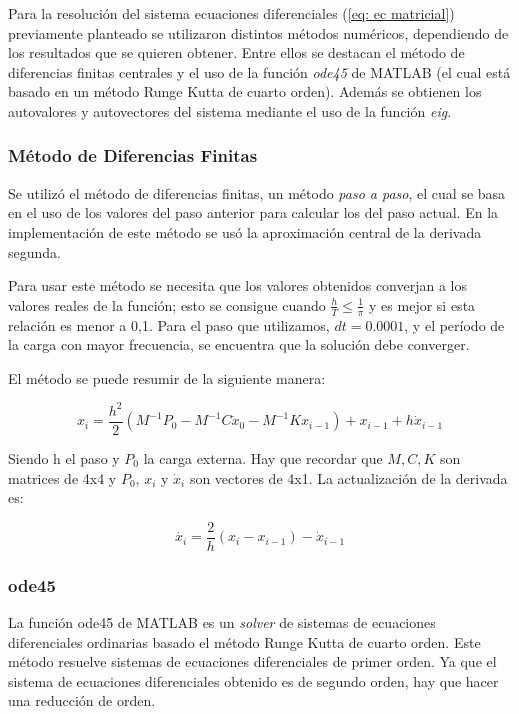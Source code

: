 \documentclass[oneside, a4paper, spanish, links]{amca}
\begin{document}
Para la resolución del sistema ecuaciones diferenciales (\ref{eq: ec matricial}) previamente planteado se utilizaron distintos métodos numéricos, dependiendo de los resultados que se quieren obtener. Entre ellos se destacan el método de diferencias finitas centrales y el uso de la función \textit{ode45} de MATLAB (el cual está basado en un método Runge Kutta de cuarto orden). Además se obtienen los autovalores y autovectores del sistema mediante el uso de la función \textit{eig}. 

\subsubsection{Método de Diferencias Finitas}
\label{sec:dif finitas}

Se utilizó el método de diferencias finitas, un método \textit{paso a paso}, el cual se basa en el uso de los valores del paso anterior para calcular los del paso actual.
En la implementación de este método se usó la aproximación central de la derivada segunda.

Para usar este método se necesita que los valores obtenidos converjan a los valores reales de la función; esto se consigue cuando $\frac{h}{T} \leq \frac{1}{\pi}$ y es mejor si esta relación es menor a 0,1. Para el paso que utilizamos, $dt = 0.0001$, y el período de la carga con mayor frecuencia, se encuentra que la solución debe converger.

El método se puede resumir de la siguiente manera: 

\begin{equation}
    x_i=\frac{h^2}{2}(M^{-1}P_0 - M^{-1}C\dot{x}_0 - M^{-1}Kx_{i-1}) + x_{i-1} + h\dot{x}_{i-1}
\end{equation}

Siendo h el paso y $P_0$ la carga externa. Hay que recordar que $M, C, K$ son matrices de 4x4 y $P_0$, $x_i$ y $\dot{x}_i$ son vectores de 4x1. La actualización de la derivada es: 

\begin{equation}
    \dot{x_i}=\frac{2}{h}(x_i-x_{i-1})-{\dot{x}_{i-1}}
\end{equation}

\subsubsection{ode45}
\label{sec:ode45}

La función ode45 de MATLAB es un \textit{solver} de sistemas de ecuaciones diferenciales ordinarias basado el método Runge Kutta de cuarto orden. Este método resuelve sistemas de ecuaciones diferenciales de primer orden. Ya que el sistema de ecuaciones diferenciales obtenido es de segundo orden, hay que hacer una reducción de orden.
\end{document}
